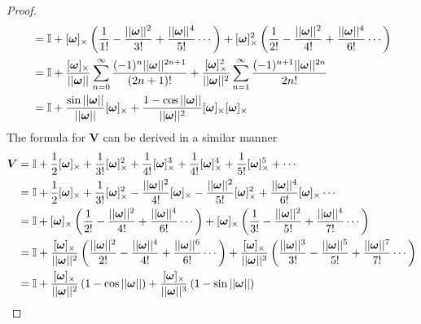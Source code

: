 \begin{proof}
\begin{subequations}
\begin{align*}
       &= \mathbb{I} + [\bm{\omega}]_{\times}\left(\frac{1}{1!} - \frac{||\bm{\omega}||^2}{3!} + \frac{||\bm{\omega}||^4}{5!} \cdots\right)
       + [\bm{\omega}]_{\times}^2\left(\frac{1}{2!} - \frac{||\bm{\omega}||^2}{4!} + \frac{||\bm{\omega}||^4}{6!} \cdots\right)\\
       &= \mathbb{I} + \frac{[\bm{\omega}]_{\times}}{||\bm{\omega}||}\sum_{n=0}^{\infty}\frac{(-1)^{n}||\bm{\omega}||^{2n+1}}{(2n+1)!}
       + \frac{[\bm{\omega}]_{\times}^2}{||\bm{\omega}||^2}\sum_{n=1}^{\infty}\frac{(-1)^{n+1}||\bm{\omega}||^{2n}}{2n!} \\
    &= \mathbb{I}
    + \frac{\sin{||\bm{\omega}||}}{||\bm{\omega}||}[\bm{\omega}]_{\times}
    + \frac{1-\cos{||\bm{\omega}||}}{||\bm{\omega}||^2}
       [\bm{\omega}]_{\times}[\bm{\omega}]_{\times}
\end{align*}
\end{subequations} 
The formula for \(\bm{V}\) can be derived in a similar manner
\begin{subequations}
\begin{align*}
\bm{V} &= \mathbb{I} + \frac{1}{2}[ \bm{\omega} ]_{\times}+ \frac{1}{3!}[ \bm{\omega} ]_{\times}^2 + \frac{1}{4!}[ \bm{\omega} ]_{\times}^3 + \frac{1}{4!}[ \bm{\omega} ]_{\times}^4 + \frac{1}{5!}[ \bm{\omega} ]_{\times}^5 + \cdots \\
    &= \mathbb{I} + \frac{1}{2}[ \bm{\omega} ]_{\times}+ \frac{1}{3!}[ \bm{\omega} ]_{\times}^2 - \frac{||\bm{\omega}||^2}{4!}[ \bm{\omega} ]_{\times} - \frac{||\bm{\omega}||^2}{5!}[ \bm{\omega} ]_{\times}^2 + \frac{||\bm{\omega}||^4}{6!}[ \bm{\omega} ]_{\times} \cdots \\
&= \mathbb{I} + [ \bm{\omega} ]_{\times}\left(\frac{1}{2!} - \frac{||\bm{\omega}||^2}{4!} + \frac{||\bm{\omega}||^4}{6!} \cdots\right)
+ [ \bm{\omega} ]_{\times}\left(\frac{1}{3!} - \frac{||\bm{\omega}||^2}{5!} + \frac{||\bm{\omega}||^4}{7!}\cdots\right)\\
&= \mathbb{I} + \frac{[ \bm{\omega} ]_{\times}}{||\bm{\omega}||^2}\left(\frac{||\bm{\omega}||^2}{2!} - \frac{||\bm{\omega}||^4}{4!} + \frac{||\bm{\omega}||^6}{6!} \cdots\right)
+ \frac{[ \bm{\omega} ]_{\times}}{||\bm{\omega}||^3}\left(\frac{||\bm{\omega}||^3}{3!} - \frac{||\bm{\omega}||^5}{5!} + \frac{||\bm{\omega}||^7}{7!}\cdots\right) \\
&= \mathbb{I} + \frac{[ \bm{\omega} ]_{\times}}{||\bm{\omega}||^2}\left(1 - \cos{||\bm{\omega}||}\right)
+ \frac{[ \bm{\omega} ]_{\times}}{||\bm{\omega}||^3}\left(1-\sin{||\bm{\omega}||}\right)
\end{align*}
\end{subequations}
\end{proof}

